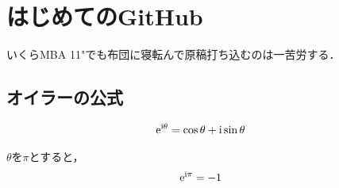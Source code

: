\documentclass[b5j,fleqn]{jsarticle}
\begin{document}
\section{はじめてのGitHub}
いくらMBA 11"でも布団に寝転んで原稿打ち込むのは一苦労する．

\subsection{オイラーの公式}

\begin{align}
   \rm{e}^{\rm{i}\theta} &= \cos{\theta} + \rm{i}\sin{\theta}
\end{align}

$\theta$を$\pi$とすると，
\begin{align}
   \rm{e}^{\rm{i}\pi} &= -1
\end{align}
\end{document}
